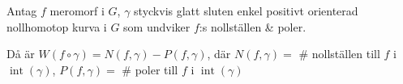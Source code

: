 \begin{theorem}
Antag $f$ meromorf i $G$, $\gamma$ styckvis glatt sluten enkel positivt orienterad nollhomotop kurva i $G$ som undviker $f$:s nollställen \& poler.

Då är $W(f \circ \gamma) = N(f, \gamma) - P(f, \gamma)$, där $N(f, \gamma) = $ \# nollställen till $f$ i $\operatorname{int}(\gamma)$, $P(f, \gamma) = $ \# poler till $f$ i $\operatorname{int}(\gamma)$
\end{theorem}
